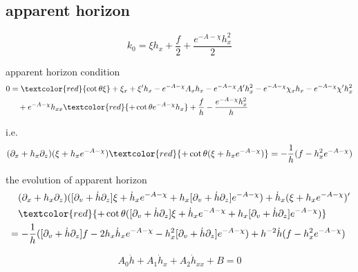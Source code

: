 \documentclass[12pt,a4paper]{ctexart}
\numberwithin{equation}{section}
\begin{document}
\subsection{apparent horizon}

\begin{equation}
    k_0=\xi h_x + \frac{f}{2} + \frac{e^{- A - \chi} h_x^2}{2}
\end{equation}

apparent horizon condition
\begin{equation}
    \begin{aligned}
        0&=\textcolor{red}{\cot\theta\xi}+\xi_x + \xi' h_x - e^{-A-\chi} A_x h_x - e^{-A-\chi} A' h_x^2 - e^{-A-\chi} \chi_x h_x - e^{-A-\chi} \chi' h_x^2\\
        &\quad + e^{-A-\chi} h_{xx} \textcolor{red}{+\cot\theta e^{-A-\chi}h_x} + \frac{f}{h} - \frac{e^{-A-\chi} h_x^2}{h}
    \end{aligned}
\end{equation}

i.e.
\begin{equation}
    (\partial_{x}+h_{x}\partial_{z})(\xi+h_{x}e^{-A-\chi})\textcolor{red}{+\cot\theta(\xi+h_{x}e^{-A-\chi})}=-\frac{1}{h}(f-h_{x}^{2}e^{-A-\chi})
\end{equation}

the evolution of apparent horizon
\begin{equation}
    \begin{aligned}
        &\quad(\partial_{x}+h_{x}\partial_{z})([\partial_{v}+\dot{h}\partial_{z}]\xi+\dot{h}_{x}e^{-A-\chi}+h_{x}[\partial_{v}+\dot{h}\partial_{z}]e^{-A-\chi})+\dot{h}_{x}(\xi+h_{x}e^{-A-\chi})^{\prime}\\
        &\quad\textcolor{red}{+\cot\theta([\partial_{v}+\dot{h}\partial_{z}]\xi+\dot{h}_{x}e^{-A-\chi}+h_{x}[\partial_{v}+\dot{h}\partial_{z}]e^{-A-\chi})}\\
        &=-\frac{1}{h}([\partial_{v}+\dot{h}\partial_{z}]f-2h_{x}\dot{h}_{x}e^{-A-\chi}-h_{x}^{2}[\partial_{v}+\dot{h}\partial_{z}]e^{-A-\chi})+h^{-2}\dot{h}(f-h_{x}^{2}e^{-A-\chi})
    \end{aligned}
\end{equation}

\begin{equation}
    A_0\dot{h}+A_1\dot{h}_x+A_2\dot{h}_{xx}+B=0
\end{equation}
\end{document}
